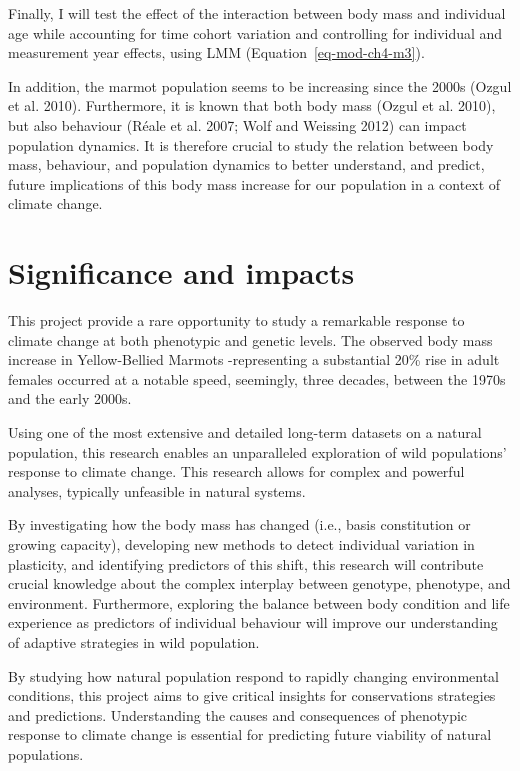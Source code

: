 \documentclass[
  12pt,
  letterpaper,
]{scrartcl}
\begin{document}
Finally, I will test the effect of the interaction between body mass and
individual age while accounting for time cohort variation and
controlling for individual and measurement year effects, using LMM
(Equation~\ref{eq-mod-ch4-m3}).

In addition, the marmot population seems to be increasing since the
2000s (Ozgul et al. 2010). Furthermore, it is known that both body mass
(Ozgul et al. 2010), but also behaviour (Réale et al. 2007; Wolf and
Weissing 2012) can impact population dynamics. It is therefore crucial
to study the relation between body mass, behaviour, and population
dynamics to better understand, and predict, future implications of this
body mass increase for our population in a context of climate change.

\newpage{}

\section{Significance and impacts}\label{sec-signif}

This project provide a rare opportunity to study a remarkable response
to climate change at both phenotypic and genetic levels. The observed
body mass increase in Yellow-Bellied Marmots -representing a substantial
20\% rise in adult females occurred at a notable speed, seemingly, three
decades, between the 1970s and the early 2000s.

Using one of the most extensive and detailed long-term datasets on a
natural population, this research enables an unparalleled exploration of
wild populations' response to climate change. This research allows for
complex and powerful analyses, typically unfeasible in natural systems.

By investigating how the body mass has changed (i.e., basis constitution
or growing capacity), developing new methods to detect individual
variation in plasticity, and identifying predictors of this shift, this
research will contribute crucial knowledge about the complex interplay
between genotype, phenotype, and environment. Furthermore, exploring the
balance between body condition and life experience as predictors of
individual behaviour will improve our understanding of adaptive
strategies in wild population.

By studying how natural population respond to rapidly changing
environmental conditions, this project aims to give critical insights
for conservations strategies and predictions. Understanding the causes
and consequences of phenotypic response to climate change is essential
for predicting future viability of natural populations.
\end{document}
